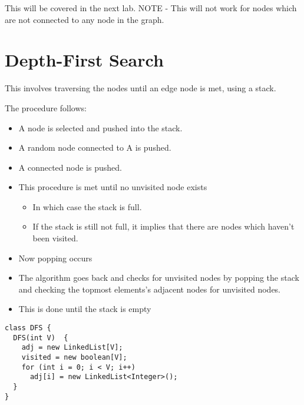 \documentclass[11pt]{article}
\begin{document}
This will be covered in the next lab.
 NOTE - This will not work for nodes which are not connected to any node in the graph.
\section{Depth-First Search}
\label{sec:org2b6af0a}

This involves traversing the nodes until an edge node is met, using a stack.

The procedure follows:
\begin{itemize}
\item A node is selected and pushed into the stack.
\item A random node connected to A is pushed.
\item A connected node is pushed.
\item This procedure is met until no unvisited node exists
\begin{itemize}
\item In which case the stack is full.
\item If the stack is still not full, it implies that there are nodes which haven't been visited.
\end{itemize}
\item Now popping occurs
\item The algorithm goes back and checks for unvisited nodes by popping the stack and checking the topmost elements's adjacent nodes for unvisited nodes.
\item This is done until the stack is empty
\end{itemize}

\begin{verbatim}
class DFS {
  DFS(int V)  {
    adj = new LinkedList[V];
    visited = new boolean[V];
    for (int i = 0; i < V; i++)
      adj[i] = new LinkedList<Integer>();
  }
}
\end{verbatim}
\end{document}
